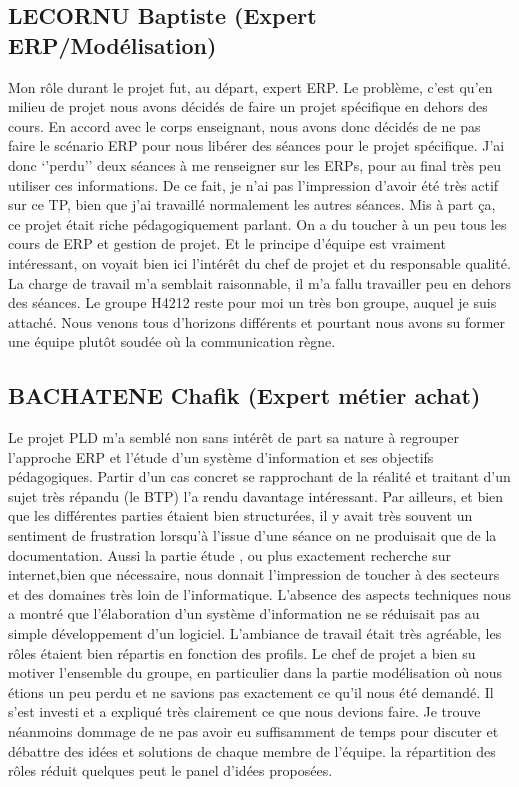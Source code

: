        \subsection{LECORNU Baptiste (Expert ERP/Modélisation)}
Mon rôle durant le projet fut, au départ, expert ERP. Le problème, c’est qu’en milieu de projet nous avons décidés de faire un projet spécifique en dehors des cours. En accord avec le corps enseignant, nous avons donc décidés de ne pas faire le scénario ERP pour nous libérer des séances pour le projet spécifique. J’ai donc ‘’perdu’’ deux séances à me renseigner sur les ERPs, pour au final très peu utiliser ces informations. De ce fait, je n’ai pas l’impression d’avoir été très actif sur ce TP, bien que j’ai travaillé normalement les autres séances. 
Mis à part ça, ce projet était riche pédagogiquement parlant. On a du toucher à un peu tous les cours de ERP et gestion de projet. Et le principe d’équipe est vraiment intéressant, on voyait bien ici l’intérêt du chef de projet et du responsable qualité.
La charge de travail m’a semblait raisonnable, il m’a fallu travailler peu en dehors des séances.
 Le groupe H4212 reste pour moi un très bon groupe, auquel je suis attaché. Nous venons tous d’horizons différents et pourtant nous avons su former une équipe plutôt soudée où la communication règne.

       \subsection{BACHATENE Chafik (Expert métier achat)}

Le projet PLD m'a semblé non sans intérêt de part sa nature à regrouper l'approche ERP et l'étude d'un système d'information et ses objectifs pédagogiques.
Partir d'un cas concret se rapprochant de la réalité et traitant d'un sujet très répandu (le BTP) l'a rendu davantage intéressant. Par ailleurs, et bien que
les différentes parties étaient bien structurées, il y avait très souvent un sentiment de frustration lorsqu'à l'issue d'une séance on ne produisait que de la documentation. Aussi la partie étude , ou plus exactement recherche sur internet,bien que nécessaire, nous donnait l'impression de toucher à des secteurs et des domaines très loin de l'informatique. 
L'absence des aspects techniques nous a montré que l'élaboration d'un système d'information ne se réduisait pas au simple développement d'un logiciel. 
L'ambiance de travail était très agréable, les rôles étaient bien répartis en fonction des profils. Le chef de projet a bien su motiver l'ensemble du groupe, en particulier dans la partie modélisation où nous étions un peu perdu et ne savions pas exactement ce qu'il nous été demandé. Il s'est investi et a expliqué très clairement ce que nous devions faire.
Je trouve néanmoins dommage de ne pas avoir eu suffisamment de temps pour discuter et débattre des idées et solutions de chaque membre de l'équipe. la répartition des rôles réduit quelques peut le panel d'idées proposées. 


